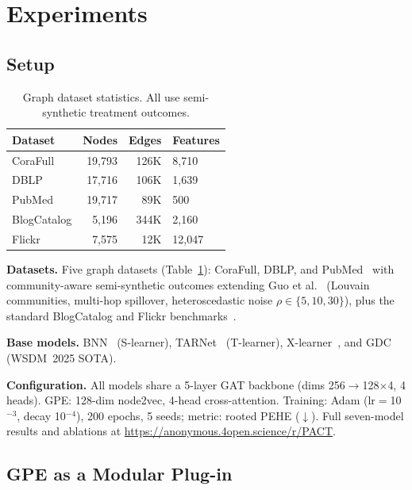 \documentclass[sigconf,anonymous,review]{acmart}
\begin{document}
\section{Experiments}\label{sec:exp}

\subsection{Setup}

\begin{table}[t]
\caption{Graph dataset statistics. All use semi-synthetic treatment outcomes.}
\label{tab:datasets}
\centering
\footnotesize
\begin{tabular}{@{}lrrl@{}}
\toprule
Dataset & Nodes & Edges & Features \\
\midrule
CoraFull & 19,793 & 126K & 8,710 \\
DBLP & 17,716 & 106K & 1,639 \\
PubMed & 19,717 & 89K & 500 \\
BlogCatalog & 5,196 & 344K & 2,160 \\
Flickr & 7,575 & 12K & 12,047 \\
\bottomrule
\end{tabular}
\end{table}

\textbf{Datasets.} Five graph datasets (Table~\ref{tab:datasets}): CoraFull, DBLP, and PubMed~\cite{bojchevski2018deep} with community-aware semi-synthetic outcomes extending Guo et al.~\cite{guo2020learning} (Louvain communities, multi-hop spillover, heteroscedastic noise $\rho \in \{5, 10, 30\}$), plus the standard BlogCatalog and Flickr benchmarks~\cite{guo2020learning}.

\textbf{Base models.} BNN~\cite{johansson2016learning} (S-learner), TARNet~\cite{shalit2017estimating} (T-learner), X-learner~\cite{kunzel2019metalearners}, and GDC~\cite{hu2025gdc} (WSDM~2025 SOTA).

\textbf{Configuration.} All models share a 5-layer GAT backbone (dims 256$\to$128$\times$4, 4 heads). GPE: 128-dim node2vec, 4-head cross-attention. Training: Adam (lr$=$10$^{-3}$, decay 10$^{-4}$), 200 epochs, 5 seeds; metric: rooted PEHE ($\downarrow$). Full seven-model results and ablations at \url{https://anonymous.4open.science/r/PACT}.

\subsection{GPE as a Modular Plug-in}
\end{document}
